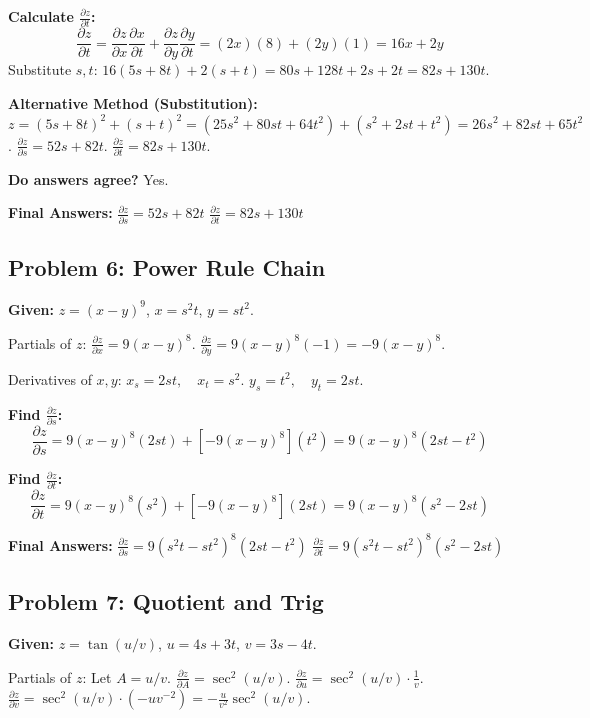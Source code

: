 \documentclass[11pt, letterpaper]{article}
\theoremstyle{definition}
\begin{document}
\textbf{Calculate $\frac{\partial z}{\partial t}$:}
\[ \frac{\partial z}{\partial t} = \frac{\partial z}{\partial x}\frac{\partial x}{\partial t} + \frac{\partial z}{\partial y}\frac{\partial y}{\partial t} = (2x)(8) + (2y)(1) = 16x + 2y \]
Substitute $s, t$:
$16(5s+8t) + 2(s+t) = 80s + 128t + 2s + 2t = 82s + 130t$.

\textbf{Alternative Method (Substitution):}
$z = (5s+8t)^2 + (s+t)^2 = (25s^2 + 80st + 64t^2) + (s^2 + 2st + t^2) = 26s^2 + 82st + 65t^2$.
$\frac{\partial z}{\partial s} = 52s + 82t$.
$\frac{\partial z}{\partial t} = 82s + 130t$.

\textbf{Do answers agree?} Yes.

\textbf{Final Answers:}
$\frac{\partial z}{\partial s} = \boxed{52s + 82t}$
$\frac{\partial z}{\partial t} = \boxed{82s + 130t}$


\subsection*{Problem 6: Power Rule Chain}
\textbf{Given:} $z = (x-y)^9$, $x = s^2t$, $y = st^2$.

Partials of $z$:
$\frac{\partial z}{\partial x} = 9(x-y)^8$.
$\frac{\partial z}{\partial y} = 9(x-y)^8(-1) = -9(x-y)^8$.

Derivatives of $x, y$:
$x_s = 2st, \quad x_t = s^2$.
$y_s = t^2, \quad y_t = 2st$.

\textbf{Find $\frac{\partial z}{\partial s}$:}
\[ \frac{\partial z}{\partial s} = 9(x-y)^8(2st) + [-9(x-y)^8](t^2) = 9(x-y)^8(2st - t^2) \]

\textbf{Find $\frac{\partial z}{\partial t}$:}
\[ \frac{\partial z}{\partial t} = 9(x-y)^8(s^2) + [-9(x-y)^8](2st) = 9(x-y)^8(s^2 - 2st) \]

\textbf{Final Answers:}
$\frac{\partial z}{\partial s} = \boxed{9(s^2t - st^2)^8(2st - t^2)}$
$\frac{\partial z}{\partial t} = \boxed{9(s^2t - st^2)^8(s^2 - 2st)}$


\subsection*{Problem 7: Quotient and Trig}
\textbf{Given:} $z = \tan(u/v)$, $u = 4s + 3t$, $v = 3s - 4t$.

Partials of $z$:
Let $A = u/v$. $\frac{\partial z}{\partial A} = \sec^2(u/v)$.
$\frac{\partial z}{\partial u} = \sec^2(u/v) \cdot \frac{1}{v}$.
$\frac{\partial z}{\partial v} = \sec^2(u/v) \cdot (-u v^{-2}) = -\frac{u}{v^2}\sec^2(u/v)$.
\end{document}
